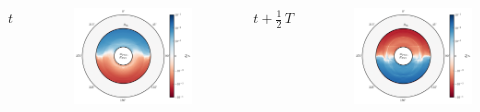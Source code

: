 \documentclass{beamer}
\begin{document}
\begin{frame}

  \begin{columns}[c]

      \centerline{$t$}
      \begin{figure}[htb!]
        \centering
        \includegraphics[width=\textwidth]{fig.AF_P_0.00T.png}
      \end{figure}
      \centerline{$t+\frac{1}{2}\,T$}
      \begin{figure}[htb!]
        \centering
        \includegraphics[width=\textwidth]{fig.AF_P_0.50T.png}

\end{figure}
\end{columns}
\end{frame}
\end{document}
